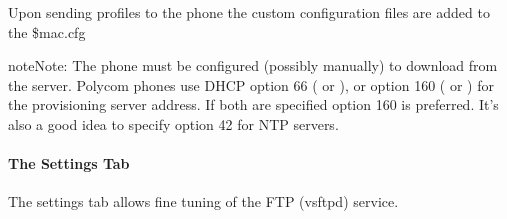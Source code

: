 \documentclass[letterpaper,10pt,english]{sphinxmanual}
\begin{document}

Upon sending profiles to the phone the custom configuration files are added to the \$mac.cfg

\begin{sphinxVerbatim}[commandchars=\\\{\}]
\end{sphinxVerbatim}

\begin{sphinxadmonition}{note}{Note:}
The phone must be configured (possibly manually) to download from the server.
Polycom phones use DHCP option 66 ( or ), or option 160 ( or ) for the provisioning server address.
If both are specified option 160 is preferred. It’s also a good idea to specify option 42 for NTP servers.
\end{sphinxadmonition}


\paragraph{The Settings Tab}
\label{\detokenize{webui:the-settings-tab}}
The settings tab allows fine tuning of the FTP (vsftpd) service.
\begin{quote}

\end{quote}
\end{document}

